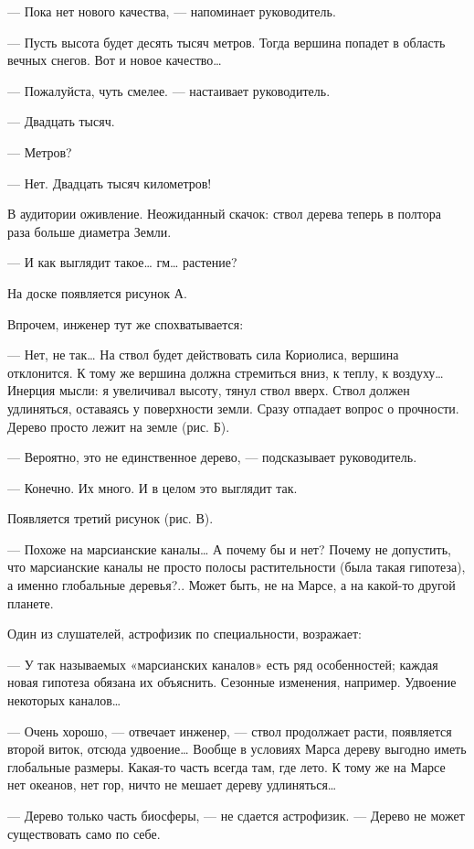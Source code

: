 — Пока нет нового качества, — напоминает руководитель.

— Пусть высота будет десять тысяч метров. Тогда вершина попадет в  область
вечных снегов. Вот и новое качество…

— Пожалуйста, чуть смелее. — настаивает руководитель.

— Двадцать тысяч.

— Метров?

— Нет. Двадцать тысяч километров!

В аудитории оживление. Неожиданный скачок:  ствол дерева теперь в  полтора
раза больше диаметра Земли.

— И как выглядит такое… гм… растение?

На доске появляется рисунок А.

Впрочем, инженер тут же спохватывается:

— Нет,  не  так…  На  ствол  будет  действовать  сила  Кориолиса,  вершина
отклонится. К тому же вершина должна стремиться вниз, к теплу, к  воздуху…
Инерция мысли:  я  увеличивал  высоту, тянул  ствол  вверх.  Ствол  должен
удлиняться,  оставаясь  у  поверхности  земли.  Сразу  отпадает  вопрос  о
прочности. Дерево просто лежит на земле (рис. Б).

— Вероятно, это не единственное дерево, — подсказывает руководитель.

— Конечно. Их много. И в целом это выглядит так.

Появляется третий рисунок (рис. В).

— Похоже на марсианские  каналы… А почему бы  и нет? Почему не  допустить,
что  марсианские  каналы  не  просто  полосы  растительности  (была  такая
гипотеза), а именно глобальные  деревья?.. Может быть, не  на Марсе, а  на
какой-то другой планете.

Один из слушателей, астрофизик по специальности, возражает:

— У так  называемых «марсианских  каналов» есть  ряд особенностей;  каждая
новая  гипотеза  обязана  их  объяснить.  Сезонные  изменения,   например.
Удвоение некоторых каналов…

— Очень хорошо, — отвечает  инженер, — ствол продолжает расти,  появляется
второй виток,  отсюда удвоение…  Вообще в  условиях Марса  дереву  выгодно
иметь глобальные размеры. Какая-то часть всегда  там, где лето. К тому  же
на Марсе нет океанов, нет гор, ничто не мешает дереву удлиняться…

— Дерево только часть биосферы, — не сдается астрофизик. — Дерево не может
существовать само по себе.

